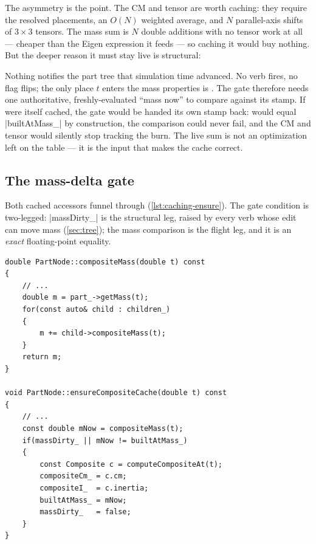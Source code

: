The asymmetry is the point. The CM and tensor are worth caching: they require the resolved
placements, an $O(N)$ weighted average, and $N$ parallel-axis shifts of $3\times3$ tensors. The
mass sum is $N$ double additions with no tensor work at all --- cheaper than the Eigen expression
it feeds --- so caching it would buy nothing. But the deeper reason it must stay live is
structural:

\begin{keyinsight}
Nothing notifies the part tree that simulation time advanced. No verb fires, no flag flips; the
only place $t$ enters the mass properties is . The gate therefore needs
one authoritative, freshly-evaluated ``mass now'' to compare against its stamp. If
 were itself cached, the gate would be handed its own stamp back:
 would equal \cppinline|builtAtMass_| by construction, the comparison could never fail,
and the CM and tensor would silently stop tracking the burn. The live sum is not an optimization
left on the table --- it is the input that makes the cache correct.
\end{keyinsight}

\subsection{The mass-delta gate}\label{sec:caching-massgate}

Both cached accessors funnel through  (\cref{lst:caching-ensure}). The
gate condition is two-legged: \cppinline|massDirty_| is the structural leg, raised by every
 verb whose edit can move mass (\cref{sec:tree}); the mass comparison is the
flight leg, and it is an \emph{exact} floating-point equality.

\begin{listing}[htbp]
\begin{verbatim}
double PartNode::compositeMass(double t) const
{
    // ...
    double m = part_->getMass(t);
    for(const auto& child : children_)
    {
        m += child->compositeMass(t);
    }
    return m;
}

void PartNode::ensureCompositeCache(double t) const
{
    // ...
    const double mNow = compositeMass(t);
    if(massDirty_ || mNow != builtAtMass_)
    {
        const Composite c = computeCompositeAt(t);
        compositeCm_ = c.cm;
        compositeI_  = c.inertia;
        builtAtMass_ = mNow;
        massDirty_   = false;
    }
}
\end{verbatim}
\caption{The live sum and the mass-delta gate (). Stamps
are written only after  succeeds, so a failed placement solve is never
absorbed by the cache (\cref{sec:caching-composite}).}\label{lst:caching-ensure}
\end{listing}

